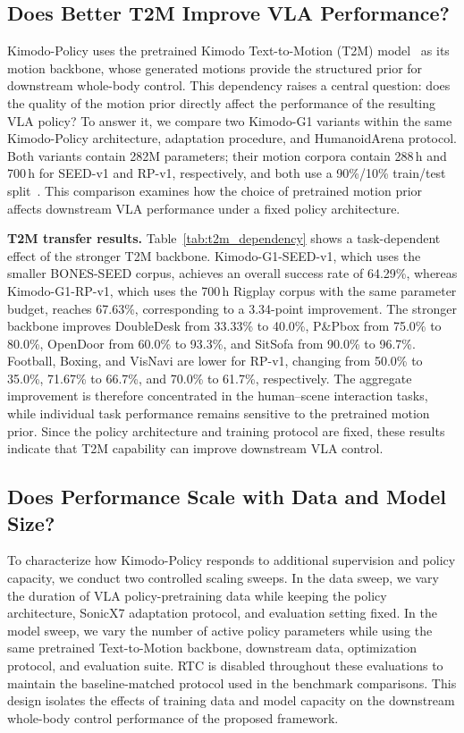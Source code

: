 \subsection{Does Better T2M Improve VLA Performance?}
\label{sec:exp_t2m}
Kimodo-Policy uses the pretrained Kimodo Text-to-Motion (T2M) model~\cite{kimodo} as its motion backbone, whose generated motions provide the structured prior for downstream whole-body control. This dependency raises a central question: does the quality of the motion prior directly affect the performance of the resulting VLA policy? To answer it, we compare two Kimodo-G1 variants within the same Kimodo-Policy architecture, adaptation procedure, and HumanoidArena protocol. Both variants contain 282M parameters; their motion corpora contain 288\,h and 700\,h for SEED-v1 and RP-v1, respectively, and both use a 90\%/10\% train/test split~\cite{kimodo}. This comparison examines how the choice of pretrained motion prior affects downstream VLA performance under a fixed policy architecture.

\textbf{T2M transfer results.} Table~\ref{tab:t2m_dependency} shows a task-dependent effect of the stronger T2M backbone. Kimodo-G1-SEED-v1, which uses the smaller BONES-SEED corpus, achieves an overall success rate of 64.29\%, whereas Kimodo-G1-RP-v1, which uses the 700\,h Rigplay corpus with the same parameter budget, reaches 67.63\%, corresponding to a 3.34-point improvement. The stronger backbone improves DoubleDesk from 33.33\% to 40.0\%, P\&Pbox from 75.0\% to 80.0\%, OpenDoor from 60.0\% to 93.3\%, and SitSofa from 90.0\% to 96.7\%. Football, Boxing, and VisNavi are lower for RP-v1, changing from 50.0\% to 35.0\%, 71.67\% to 66.7\%, and 70.0\% to 61.7\%, respectively. The aggregate improvement is therefore concentrated in the human--scene interaction tasks, while individual task performance remains sensitive to the pretrained motion prior. Since the policy architecture and training protocol are fixed, these results indicate that T2M capability can improve downstream VLA control.

\subsection{Does Performance Scale with Data and Model Size?}
\label{sec:exp_scaling}
To characterize how Kimodo-Policy responds to additional supervision and policy capacity, we conduct two controlled scaling sweeps. In the data sweep, we vary the duration of VLA policy-pretraining data while keeping the policy architecture, SonicX7 adaptation protocol, and evaluation setting fixed. In the model sweep, we vary the number of active policy parameters while using the same pretrained Text-to-Motion backbone, downstream data, optimization protocol, and evaluation suite. RTC is disabled throughout these evaluations to maintain the baseline-matched protocol used in the benchmark comparisons. This design isolates the effects of training data and model capacity on the downstream whole-body control performance of the proposed framework.


